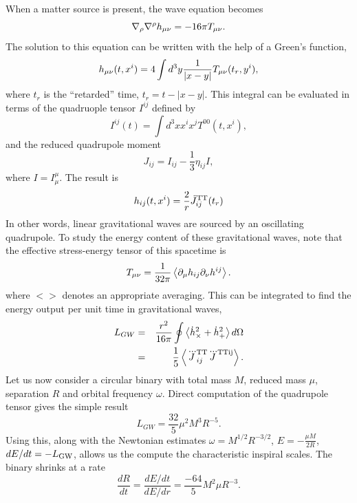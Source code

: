 When a matter source is present, the wave equation becomes
\begin{equation}
\nabla_{\rho}\nabla^{\rho}h_{\mu\nu}=-16\pi T_{\mu\nu}.
\end{equation}
The solution to this equation can be written with the help of a Green's function,
\begin{equation}
h_{\mu\nu}(t,x^{i})=4\int{d^3y\frac{1}{|x-y|}T_{\mu\nu}(t_r,y^i)},
\end{equation}
where $t_r$ is the ``retarded'' time, $t_r=t-|x-y|$. This integral can be evaluated in terms of the quadruople tensor $I^{ij}$ defined by
\begin{equation}
I^{ij}(t)=\int{d^3x x^ix^jT^{00}(t,x^i)},
\end{equation}
and the reduced quadrupole moment
\begin{equation}
J_{ij}=I_{ij}-\frac{1}{3}\eta_{ij}I,
\end{equation}
where $I=I^{\mu}_{\mu}$.
The result is
\begin{equation}
h_{ij}(t,x^i)=\frac{2}{r}\ddot{J}_{ij}^{\rm{TT}}(t_r)
\end{equation}
In other words, linear gravitational waves are sourced by an oscillating quadrupole. To study the energy content of these gravitational waves, note that the effective stress-energy tensor of this spacetime is
\begin{equation}
T_{\mu\nu}=\frac{1}{32\pi}\left<\partial_{\mu}h_{ij}\partial_{\nu}h^{ij}\right>.
\end{equation}
where $<>$ denotes an appropriate averaging. This can be integrated to find the energy output per unit time in gravitational waves,
\begin{eqnarray}
\label{eq:LGW}
L_{GW}&=&\frac{r^2}{16\pi}\oint{\left<\dot{h}_{\times}^2+\dot{h}_{+}^2\right>d\Omega}\\
&=&\frac{1}{5}\left<\dddot{J}_{ij}^{\rm{TT}}\dddot{J}^{\rm{TT} ij}\right>.
\end{eqnarray}
Let us now consider a circular binary with total mass $M$, reduced mass $\mu$, separation $R$ and orbital frequency $\omega$. Direct computation of the quadrupole tensor gives the simple result
\begin{equation}
L_{GW}=\frac{32}{5}\mu^2M^3R^{-5}.
\end{equation}
Using this, along with the Newtonian estimates $\omega=M^{1/2}R^{-3/2}$, $E=-\frac{\mu M}{2R}$, $dE/dt=-L_{\rm GW}$, allows us the compute the characteristic inspiral scales. The binary shrinks at a rate
\begin{equation}
\frac{dR}{dt}=\frac{dE/dt}{dE/dr}=\frac{-64}{5}M^2\mu R^{-3}.
\end{equation}
